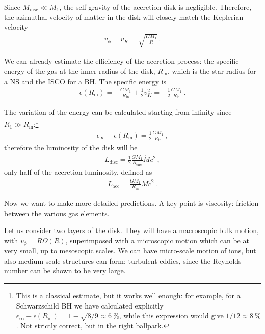 \documentclass[main.tex]{subfiles}
\begin{document}
Since \(M _{\text{disc}} \ll M_1 \), the self-gravity of the accretion disk is negligible. Therefore, the azimuthal velocity of matter in the disk will closely match the Keplerian velocity 
%
\begin{align}
v_{\phi } = v_K = \sqrt{ \frac{GM_1}{R}}
\,.
\end{align}

We can already estimate the efficiency of the accretion process: the specific energy of the gas at the inner radius of the disk, \(R _{\text{in}}\), which is the star radius for a NS and the ISCO for a BH. 
The specific energy is 
%
\begin{align}
\epsilon (R _{\text{in}}) = - \frac{GM_1 }{R _{\text{in}}} 
+ \frac{1}{2} v_K^2 = - \frac{1}{2} \frac{GM_1 }{R _{\text{in}}}
\,.
\end{align}

The variation of the energy can be calculated starting from infinity since \(R_1 \gg R _{\text{in}}\):\footnote{This is a classical estimate, but it works well enough: for example, for a Schwarzschild BH we have calculated explicitly \(\epsilon _\infty - \epsilon (R _{\text{in}}) = 1 - \sqrt{8/9} \approx \SI{6}{\percent}\), while this expression would give \(1/12 \approx \SI{8}{\percent}\). Not strictly correct, but in the right ballpark.}
%
\begin{align}
\epsilon_{\infty } - \epsilon (R _{\text{in}}) = \frac{1}{2} \frac{GM_1}{R _{\text{in}}}
\,,
\end{align}
%
therefore the luminosity of the disk will be 
%
\begin{align}
L _{\text{disc}}= \frac{1}{2} \frac{GM_1 }{R _{\text{circ}}} \dot{M} c^2
\,,
\end{align}
%
only half of the accretion luminosity, defined as
%
\begin{align}
L _{\text{acc}} = \frac{GM_1 }{R _{\text{in}}} \dot{M} c^2
\,.
\end{align}

Now we want to make more detailed predictions.
A key point is viscosity: friction between the various gas elements.

Let us consider two layers of the disk.
They will have a macroscopic bulk motion, with \(v_\phi = R \Omega(R) \),
superimposed with a microscopic motion which can be at very small, up to mesoscopic scales. 
We can have micro-scale motion of ions, but also
medium-scale structures can form: turbulent eddies, since the Reynolds number can be shown to be very large.
\end{document}
